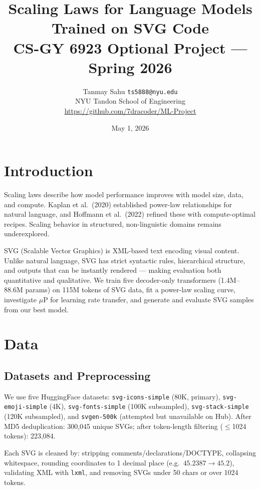 \documentclass[11pt]{article}
\title{\textbf{Scaling Laws for Language Models Trained on SVG Code}\\[4pt]
\large CS-GY 6923 Optional Project --- Spring 2026}
\author{Tanmay Sahu \quad \texttt{ts5888@nyu.edu}\\
NYU Tandon School of Engineering\\[2pt]
\small \url{https://github.com/7dracoder/ML-Project}}
\date{May 1, 2026}
\begin{document}
\maketitle
\thispagestyle{plain}

\section{Introduction}

Scaling laws describe how model performance improves with model size, data, and
compute. Kaplan et al.\ (2020) established power-law relationships for natural
language, and Hoffmann et al.\ (2022) refined these with compute-optimal recipes.
Scaling behavior in structured, non-linguistic domains remains underexplored.

SVG (Scalable Vector Graphics) is XML-based text encoding visual content.
Unlike natural language, SVG has strict syntactic rules, hierarchical structure,
and outputs that can be instantly rendered --- making evaluation both quantitative
and qualitative. We train five decoder-only transformers (1.4M--88.6M params) on
115M tokens of SVG data, fit a power-law scaling curve, investigate $\mu$P for
learning rate transfer, and generate and evaluate SVG samples from our best model.

\section{Data}

\subsection{Datasets and Preprocessing}

We use five HuggingFace datasets: \texttt{svg-icons-simple} (80K, primary),
\texttt{svg-emoji-simple} (4K), \texttt{svg-fonts-simple} (100K subsampled),
\texttt{svg-stack-simple} (120K subsampled), and \texttt{svgen-500k} (attempted
but unavailable on Hub). After MD5 deduplication: 300,045 unique SVGs; after
token-length filtering ($\leq$1024 tokens): 223,084.

Each SVG is cleaned by: stripping comments/declarations/DOCTYPE, collapsing
whitespace, rounding coordinates to 1 decimal place (e.g.\ $45.2387 \to 45.2$),
validating XML with \texttt{lxml}, and removing SVGs under 50 chars or over 1024 tokens.
\end{document}
